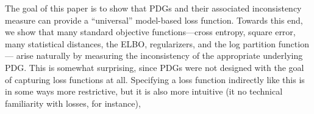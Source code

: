 \documentclass[twoside]{article}
\theoremstyle{plain}
\theoremstyle{definition}
\begin{document}
The goal of this paper is to show that PDGs and their associated inconsistency measure can provide a ``universal'' model-based loss function.
Towards this end, we show that many standard objective functions---cross
entropy, square error, many statistical distances, the ELBO,
regularizers, and the log partition function---%
arise naturally by measuring the inconsistency of
the appropriate underlying PDG.
%
This is somewhat surprising, since PDGs were not designed with the
goal of capturing loss functions at all.
Specifying a loss function indirectly like this is in some ways more restrictive,
but it is also more intuitive
(it no technical familiarity with losses, for instance),
\end{document}
